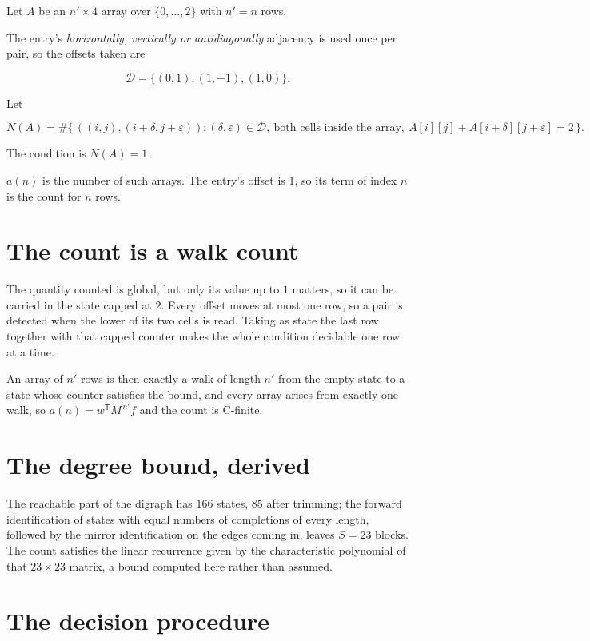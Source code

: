 \documentclass[11pt]{article}
\theoremstyle{definition}
\begin{document}
Let $A$ be an $n' \times 4$ array over $\{0,\dots,2\}$ with $n' = n$ rows.

The entry's {\itshape horizontally, vertically or antidiagonally} adjacency is used once per pair, so the offsets taken are

\[\mathcal{D} = \{(0,1), (1,-1), (1,0)\}.\]

Let

\[N(A) = \#\bigl\{\,((i,j),(i{+}\delta,j{+}\varepsilon)) : (\delta,\varepsilon) \in \mathcal{D},\ \text{both cells inside the array},\ A[i][j] + A[i{+}\delta][j{+}\varepsilon] = 2\,\bigr\}.\]

The condition is $N(A) = 1$.

$a(n)$ is the number of such arrays. The entry's offset is 1, so its term of index $n$ is the count for $n$ rows.

\section{The count is a walk count}

The quantity counted is global, but only its value up to $1$ matters, so it can be carried in the state capped at $2$. Every offset moves at most one row, so a pair is detected when the lower of its two cells is read. Taking as state the last row together with that capped counter makes the whole condition decidable one row at a time.

An array of $n'$ rows is then exactly a walk of length $n'$ from the empty state to a state whose counter satisfies the bound, and every array arises from exactly one walk, so $a(n) = w^{\mathsf T}M^{\,n'}f$ and the count is C-finite.

\section{The degree bound, derived}

The reachable part of the digraph has $166$ states, $85$ after trimming; the forward identification of states with equal numbers of completions of every length, followed by the mirror identification on the edges coming in, leaves $S = 23$ blocks. The count satisfies the linear recurrence given by the characteristic polynomial of that $23\times23$ matrix, a bound computed here rather than assumed.

\section{The decision procedure}
\end{document}
